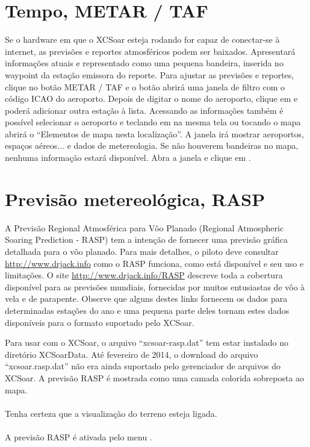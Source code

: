 \section{Tempo, METAR / TAF}\label{sec:metar-taf}

Se o hardware em que o XCSoar esteja rodando for capaz de conectar-se à internet, as previsões e reportes atmosféricos podem ser baixados.    Apresentará informações atuais e representado como uma pequena bandeira, inserida no waypoint da estação emissora do reporte. 
Para ajustar as previsões e reportes, clique no botão METAR / TAF e o botão
 abrirá uma janela de filtro com o código ICAO do aeroporto.  Depois de digitar o nome do aeroporto, clique em  e poderá adicionar outra estação à lista.  Acessando as informações também é possível selecionar o aeroporto e teclando em  na mesma tela ou tocando o mapa abrirá o “Elementos de mapa nesta localização”.  A janela irá mostrar aeroportos, espaços aéreos... e dados de metereologia. Se não houverem bandeiras no mapa, nenhuma informação estará disponível.  Abra a janela e clique em .  

\section{Previsão metereológica, RASP}\label{sec:weather-forecast}

A Previsão Regional Atmosférica para Vôo Planado (Regional Atmospheric Soaring Prediction - RASP) tem a intenção de fornecer uma previsão gráfica detalhada para o vôo planado.  Para mais detalhes, o piloto deve consultar  \url{http://www.drjack.info} como o RASP funciona, como está disponível e seu uso e limitações.  
O site \url{http://www.drjack.info/RASP} descreve toda a cobertura disponível para as previsões mundiais, fornecidas por muitos entusiastas de vôo à vela e de parapente.  Observe que alguns destes links fornecem os dados para determinadas estações do ano e uma pequena parte deles tornam estes dados disponíveis para o formato suportado pelo XCSoar.

Para usar com o XCSoar, o arquivo “xcsoar-rasp.dat” tem estar instalado no diretório XCSoarData.  Até fevereiro de 2014, o download do arquivo “xcsoar.rasp.dat” não era ainda suportado pelo gerenciador de arquivos do XCSoar. A previsão RASP é mostrada como uma camada colorida sobreposta ao mapa. \\ \\
Tenha certeza que a visualização do terreno esteja ligada. \tip{} \\ \\
A previsão RASP é ativada pelo menu   
.

